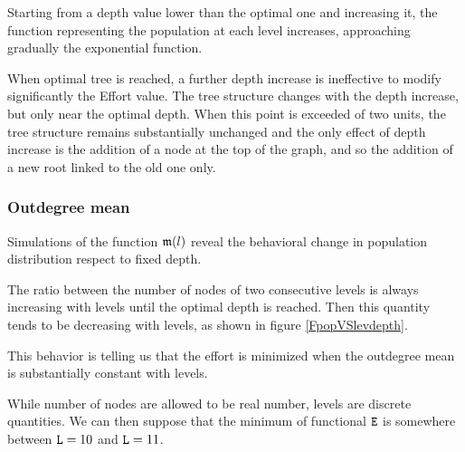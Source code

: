 Starting from a depth value lower than the optimal one and increasing it, the function representing the population at each level increases, approaching gradually the exponential function.

When optimal tree is reached, a further depth increase is ineffective to modify significantly the Effort value. The tree structure changes with the depth increase, but only near the optimal depth. When this point is exceeded of two units, the tree structure remains substantially unchanged and the only effect of depth increase is the addition of a node at the top of the graph, and so the addition of a new root linked to the old one only.

\subsubsection{Outdegree mean}
Simulations of the function $\mathfrak m(\mathnormal l)$ reveal the behavioral change in population distribution respect to fixed depth. 

The ratio between the number of nodes of two consecutive levels is always increasing with levels until the optimal depth is reached. Then this quantity tends to be decreasing with levels, as shown in figure \ref{FpopVSlevdepth}.

This behavior is telling us that the effort is minimized when the outdegree mean is substantially constant with levels.

While number of nodes are allowed to be real number, levels are discrete quantities. We can then suppose that the minimum of functional $\mathtt E$ is somewhere between $\mathtt L =10$ and $\mathtt L =11$.


